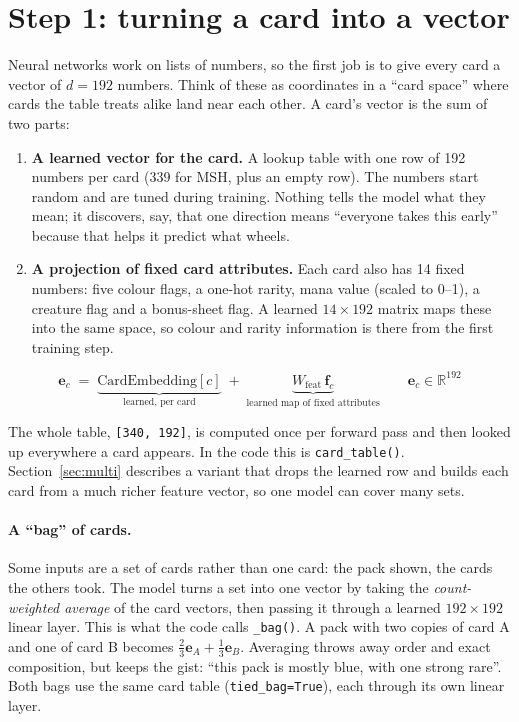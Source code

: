 \documentclass[11pt,letterpaper]{article}
\newcommand{\code}[1]{\texttt{\small #1}}
\newcommand{\shape}[1]{\texttt{\footnotesize[#1]}}
\begin{document}
\section{Step 1: turning a card into a vector}\label{sec:cards}

Neural networks work on lists of numbers, so the first job is to give every card a vector of $d=192$
numbers. Think of these as coordinates in a ``card space'' where cards the table treats alike land near each
other. A card's vector is the sum of two parts:

\begin{enumerate}
\item \textbf{A learned vector for the card.} A lookup table with one row of 192 numbers per card (339 for
MSH, plus an empty row). The numbers start random and are tuned during training. Nothing tells the model
what they mean; it discovers, say, that one direction means ``everyone takes this early'' because that helps
it predict what wheels.
\item \textbf{A projection of fixed card attributes.} Each card also has 14 fixed numbers: five colour flags,
a one-hot rarity, mana value (scaled to 0--1), a creature flag and a bonus-sheet flag. A learned
$14\times192$ matrix maps these into the same space, so colour and rarity information is there from the
first training step.
\end{enumerate}

\[
\mathbf{e}_c \;=\; \underbrace{\text{CardEmbedding}[c]}_{\text{learned, per card}}
\;+\; \underbrace{W_{\text{feat}}\,\mathbf{f}_c}_{\text{learned map of fixed attributes}}
\qquad \mathbf{e}_c \in \mathbb{R}^{192}
\]

The whole table, \shape{340, 192}, is computed once per forward pass and then looked up everywhere a card
appears. In the code this is \code{card\_table()}. Section~\ref{sec:multi} describes a variant that drops the
learned row and builds each card from a much richer feature vector, so one model can cover many sets.

\paragraph{A ``bag'' of cards.} Some inputs are a set of cards rather than one card: the pack shown, the
cards the others took. The model turns a set into one vector by taking the \emph{count-weighted average} of
the card vectors, then passing it through a learned $192\times192$ linear layer. This is what the code calls
\code{\_bag()}. A pack with two copies of card A and one of card B becomes
$\tfrac{2}{3}\mathbf{e}_A + \tfrac{1}{3}\mathbf{e}_B$. Averaging throws away order and exact composition,
but keeps the gist: ``this pack is mostly blue, with one strong rare''. Both bags use the same card table
(\code{tied\_bag=True}), each through its own linear layer.
\end{document}
